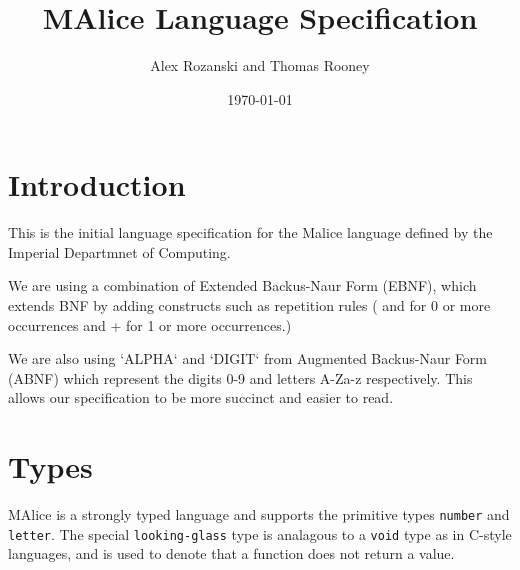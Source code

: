 \documentclass[a4wide, 11pt]{article}
\begin{document}
\title{MAlice Language Specification}

\author{Alex Rozanski and Thomas Rooney}

\date{\today}         %

\maketitle            %

\section{Introduction}

This is the initial language specification for the Malice language defined by the Imperial Departmnet of Computing. 

We are using a combination of Extended Backus-Naur Form (EBNF), which extends BNF by adding constructs such as repetition rules ({ and } for 0 or more occurrences and + for 1 or more occurrences.)

We are also using `ALPHA` and `DIGIT` from Augmented Backus-Naur Form (ABNF) which represent the digits 0-9 and letters A-Za-z respectively. This allows our specification to be more succinct and easier to read.




\section{Types}

MAlice is a strongly typed language and supports the primitive types \texttt{number} and \texttt{letter}. The special \texttt{looking-glass} type is analagous to a \texttt{void} type as in C-style languages, and is used to denote that a function does not return a value.
\end{document}
